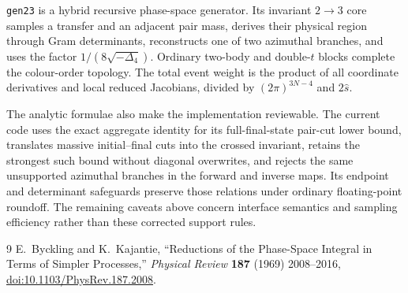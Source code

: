 \documentclass[11pt,a4paper]{article}
\newcommand{\shat}{\hat{s}}
\newcommand{\code}[1]{\texttt{#1}}
\begin{document}
\code{gen23} is a hybrid recursive phase-space generator.  Its invariant
$2\to3$ core samples a transfer and an adjacent pair mass, derives their
physical region through Gram determinants, reconstructs one of two azimuthal
branches, and uses the factor $1/(8\sqrt{-\Delta_4})$.  Ordinary two-body and
double-$t$ blocks complete the colour-order topology.  The total event weight
is the product of all coordinate derivatives and local reduced Jacobians,
divided by $(2\pi)^{3N-4}$ and $2\shat$.

The analytic formulae also make the implementation reviewable.  The current
code uses the exact aggregate identity for its full-final-state pair-cut lower
bound, translates massive initial--final cuts into the crossed invariant,
retains the strongest such bound without diagonal overwrites, and rejects the
same unsupported azimuthal branches in the forward and inverse maps.  Its
endpoint and determinant safeguards preserve those relations under ordinary
floating-point roundoff.  The remaining caveats above concern interface
semantics and sampling efficiency rather than these corrected support rules.

\begin{thebibliography}{9}
E.~Byckling and K.~Kajantie,
``Reductions of the Phase-Space Integral in Terms of Simpler Processes,''
\emph{Physical Review} \textbf{187} (1969) 2008--2016,
\href{https://doi.org/10.1103/PhysRev.187.2008}{doi:10.1103/PhysRev.187.2008}.
\end{thebibliography}
\end{document}
